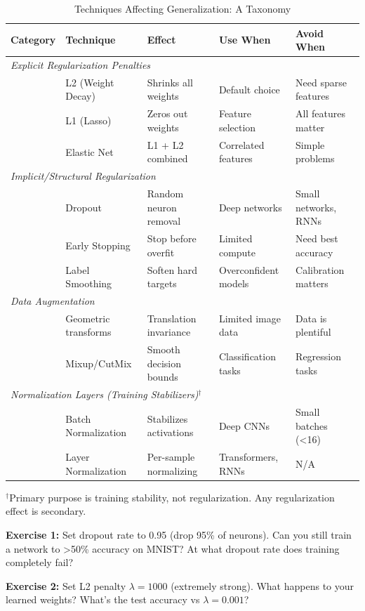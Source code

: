 \documentclass[../../main.tex]{subfiles}
\begin{document}
\begin{table}[htbp]
\centering
\caption{Techniques Affecting Generalization: A Taxonomy}
\label{tab:regularization-comparison}
\begin{tabular}{@{}lllll@{}}
\toprule
\textbf{Category} & \textbf{Technique} & \textbf{Effect} & \textbf{Use When} & \textbf{Avoid When} \\
\midrule
\multicolumn{5}{l}{\textit{Explicit Regularization Penalties}} \\
& L2 (Weight Decay) & Shrinks all weights & Default choice & Need sparse features \\
& L1 (Lasso) & Zeros out weights & Feature selection & All features matter \\
& Elastic Net & L1 + L2 combined & Correlated features & Simple problems \\
\midrule
\multicolumn{5}{l}{\textit{Implicit/Structural Regularization}} \\
& Dropout & Random neuron removal & Deep networks & Small networks, RNNs \\
& Early Stopping & Stop before overfit & Limited compute & Need best accuracy \\
& Label Smoothing\index{label smoothing|textbf} & Soften hard targets & Overconfident models & Calibration matters \\
\midrule
\multicolumn{5}{l}{\textit{Data Augmentation}} \\
& Geometric transforms & Translation invariance & Limited image data & Data is plentiful \\
& Mixup/CutMix & Smooth decision bounds & Classification tasks & Regression tasks \\
\midrule
\multicolumn{5}{l}{\textit{Normalization Layers (Training Stabilizers)$^\dagger$}} \\
& Batch Normalization & Stabilizes activations & Deep CNNs & Small batches (<16) \\
& Layer Normalization & Per-sample normalizing & Transformers, RNNs & N/A \\
\bottomrule
\end{tabular}

\vspace{0.5em}
\footnotesize{$^\dagger$Primary purpose is training stability, not regularization. Any regularization effect is secondary.}
\end{table}

\begin{whatbreaks}
\textbf{Exercise 1:} Set dropout rate to 0.95 (drop 95\% of neurons). Can you still train a network to >50\% accuracy on MNIST? At what dropout rate does training completely fail?

\textbf{Exercise 2:} Set L2 penalty $\lambda = 1000$ (extremely strong). What happens to your learned weights? What's the test accuracy vs $\lambda = 0.001$?
\end{whatbreaks}
\end{document}
